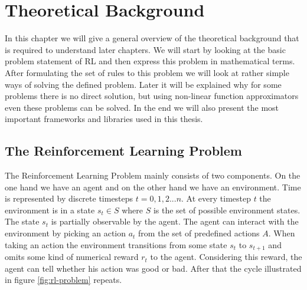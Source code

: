 \chapter{Theoretical Background}
\label{section:background}

In this chapter we will give a general overview of the theoretical background that is required to understand later chapters.
We will start by looking at the basic problem statement of RL and then express this problem in mathematical terms.
After formulating the set of rules to this problem we will look at rather simple ways of solving the defined problem.
Later it will be explained why for some problems there is no direct solution, but using non-linear function approximators even these problems can be solved.
In the end we will also present the most important frameworks and libraries used in this thesis.

\section{The Reinforcement Learning Problem}
\label{section:RL}

The Reinforcement Learning Problem mainly consists of two components.
On the one hand we have an agent and on the other hand we have an environment.
Time is represented by discrete timesteps $t = 0,1,2 ... n$.
At every timestep $t$ the environment is in a state $s_t \in S$ where $S$ is the set of possible environment states. The state $s_t$ is partially observable by the agent.
The agent can interact with the environment by picking an action $a_t$ from the set of predefined actions $A$.
When taking an action the environment transitions from some state $s_t$ to $s_{t+1}$ and omits some kind of numerical reward $r_t$ to the agent.
Considering this reward, the agent can tell whether his action was good or bad.
After that the cycle illustrated in figure \ref{fig:rl-problem} repeats.

\begin{center}
\label{fig:rl-problem}
\end{center}

